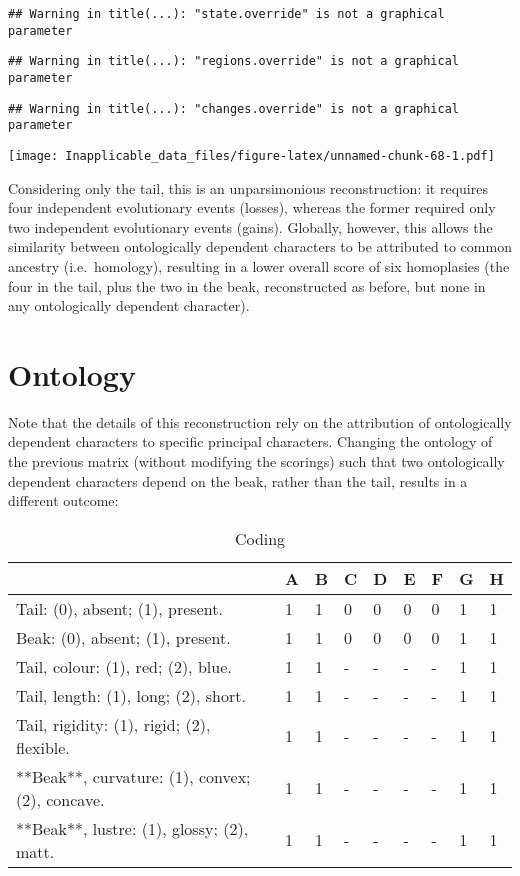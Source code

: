 \documentclass[]{book}
\theoremstyle{definition}
\theoremstyle{definition}
\theoremstyle{definition}
\theoremstyle{remark}
\begin{document}
\begin{verbatim}
## Warning in title(...): "state.override" is not a graphical parameter
\end{verbatim}

\begin{verbatim}
## Warning in title(...): "regions.override" is not a graphical parameter
\end{verbatim}

\begin{verbatim}
## Warning in title(...): "changes.override" is not a graphical parameter
\end{verbatim}

\texttt{[image: Inapplicable\_data\_files/figure-latex/unnamed-chunk-68-1.pdf]}

Considering only the tail, this is an unparsimonious reconstruction: it
requires four independent evolutionary events (losses), whereas the
former required only two independent evolutionary events (gains).
Globally, however, this allows the similarity between ontologically
dependent characters to be attributed to common ancestry
(i.e.~homology), resulting in a lower overall score of six homoplasies
(the four in the tail, plus the two in the beak, reconstructed as
before, but none in any ontologically dependent character).

\section{Ontology}\label{ontology}

Note that the details of this reconstruction rely on the attribution of
ontologically dependent characters to specific principal characters.
Changing the ontology of the previous matrix (without modifying the
scorings) such that two ontologically dependent characters depend on the
beak, rather than the tail, results in a different outcome:

\begin{table}

\caption{\label{tab:unnamed-chunk-69}Coding}
\centering
\begin{tabular}[t]{l|l|l|l|l|l|l|l|l}
\hline
  & A & B & C & D & E & F & G & H\\
\hline
Tail: (0), absent; (1), present. & 1 & 1 & 0 & 0 & 0 & 0 & 1 & 1\\
\hline
Beak: (0), absent; (1), present. & 1 & 1 & 0 & 0 & 0 & 0 & 1 & 1\\
\hline
Tail, colour: (1), red; (2), blue. & 1 & 1 & - & - & - & - & 1 & 1\\
\hline
Tail, length: (1), long; (2), short. & 1 & 1 & - & - & - & - & 1 & 1\\
\hline
Tail, rigidity: (1), rigid; (2), flexible. & 1 & 1 & - & - & - & - & 1 & 1\\
\hline
**Beak**, curvature: (1), convex; (2), concave. & 1 & 1 & - & - & - & - & 1 & 1\\
\hline
**Beak**, lustre: (1), glossy; (2), matt. & 1 & 1 & - & - & - & - & 1 & 1\\
\hline
\end{tabular}
\end{table}
\end{document}
